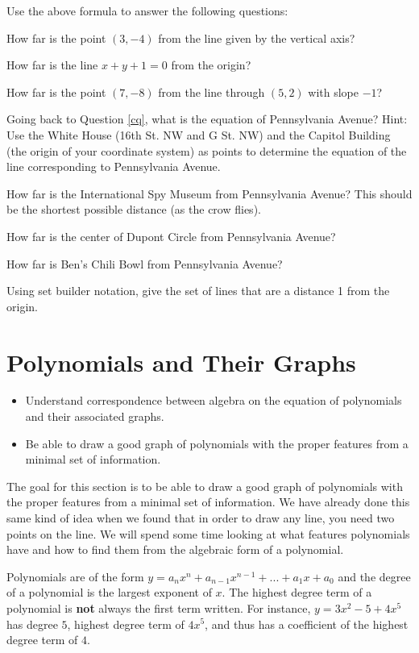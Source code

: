 \bq Use the above formula to answer the following questions:
\be
\item How far is the point $(3,-4)$ from the line given by the vertical axis?
\item How far is the line $x+y+1=0$ from the origin?
\item How far is the point $(7,-8)$ from the line through $(5,2)$ with slope $-1$?
\ee
\eq

\bq \be
\item Going back to Question \ref{cq}, what is the equation of Pennsylvania Avenue?  Hint: Use the White House (16th St. NW and G St. NW) and the Capitol Building (the origin of your coordinate system) as points to determine the equation of the line corresponding to Pennsylvania Avenue.
\item How far is the International Spy Museum from Pennsylvania Avenue? This should be the shortest possible distance (as the crow flies).
\item How far is the center of Dupont Circle from Pennsylvania Avenue?
\item How far is Ben's Chili Bowl from Pennsylvania Avenue?
\ee
\eq

\bq Using set builder notation, give the set of lines that are a distance 1 from the origin.
\eq

\section{Polynomials and Their Graphs}
\begin{itemize}
  \item Understand correspondence between algebra on the equation of polynomials and their associated graphs.
  \item Be able to draw a good graph of polynomials with the proper features from a minimal set of information.
\end{itemize}
The goal for this section is to be able to draw a good graph of polynomials with the proper features from a minimal set of information. We have already done this same kind of idea when we found that in order to draw any line, you need two points on the line.
We will spend some time looking at what features polynomials have and how to find them from the algebraic form of a polynomial.

Polynomials are of the form $y=a_n x^n+a_{n-1} x^{n-1}+ ...+a_1 x+a_0$ and the degree of a polynomial is the largest exponent of $x$. The highest degree term of a polynomial is \textbf{not} always the first term written. For instance, $y=3x^2-5+4x^5$ has degree $5$, highest degree term of $4x^5$, and thus has a coefficient of the highest degree term of $4$.

